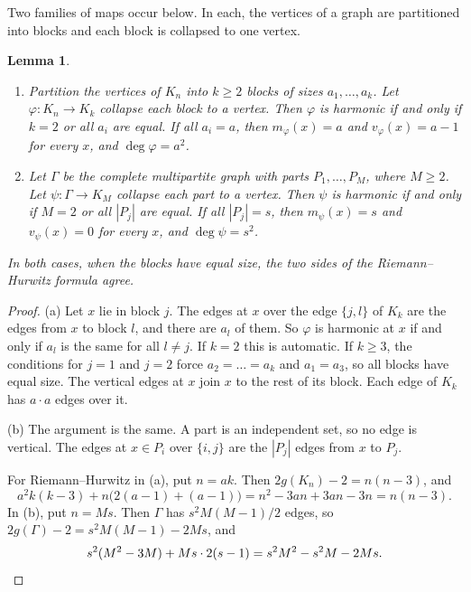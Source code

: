 \documentclass[12pt,letterpaper]{article}
\numberwithin{equation}{section}
\theoremstyle{plain}
\newtheorem{lemma}[theorem]{Lemma}
\theoremstyle{definition}
\begin{document}
Two families of maps occur below. In each, the vertices of a graph are
partitioned into blocks and each block is collapsed to one vertex.

\begin{lemma}\label{lem:collapse}
\begin{enumerate}[label=(\alph*),itemsep=1pt]
\item Partition the vertices of $K_n$ into $k\ge2$ blocks of sizes
  $a_1,\dots,a_k$. Let $\varphi\colon K_n\to K_k$ collapse each block to a
  vertex. Then $\varphi$ is harmonic if and only if $k=2$ or all $a_i$ are
  equal. If all $a_i=a$, then $m_\varphi(x)=a$ and $v_\varphi(x)=a-1$ for
  every $x$, and $\deg\varphi=a^2$.
\item Let $\Gamma$ be the complete multipartite graph with parts
  $P_1,\dots,P_M$, where $M\ge2$. Let $\psi\colon\Gamma\to K_M$ collapse
  each part to a vertex. Then $\psi$ is harmonic if and only if $M=2$ or all
  $|P_j|$ are equal. If all $|P_j|=s$, then $m_\psi(x)=s$ and
  $v_\psi(x)=0$ for every $x$, and $\deg\psi=s^2$.
\end{enumerate}
In both cases, when the blocks have equal size, the two sides of the
Riemann--Hurwitz formula agree.
\end{lemma}

\begin{proof}
(a) Let $x$ lie in block $j$. The edges at $x$ over the edge $\{j,l\}$ of
$K_k$ are the edges from $x$ to block $l$, and there are $a_l$ of them. So
$\varphi$ is harmonic at $x$ if and only if $a_l$ is the same for all $l\neq
j$. If $k=2$ this is automatic. If $k\ge3$, the conditions for $j=1$ and
$j=2$ force $a_2=\dots=a_k$ and $a_1=a_3$, so all blocks have equal size.
The vertical edges at $x$ join $x$ to the rest of its block. Each edge of
$K_k$ has $a\cdot a$ edges over it.

(b) The argument is the same. A part is an independent set, so no edge is
vertical. The edges at $x\in P_i$ over $\{i,j\}$ are the $|P_j|$ edges from
$x$ to $P_j$.

For Riemann--Hurwitz in (a), put $n=ak$. Then $2g(K_n)-2=n(n-3)$, and
\[
a^2k(k-3)+n\bigl(2(a-1)+(a-1)\bigr)=n^2-3an+3an-3n=n(n-3).
\]
In (b), put $n=Ms$. Then $\Gamma$ has $s^2M(M-1)/2$ edges, so
$2g(\Gamma)-2=s^2M(M-1)-2Ms$, and
\[
s^2(M^2-3M)+Ms\cdot2(s-1)=s^2M^2-s^2M-2Ms.\qedhere
\]
\end{proof}
\end{document}
